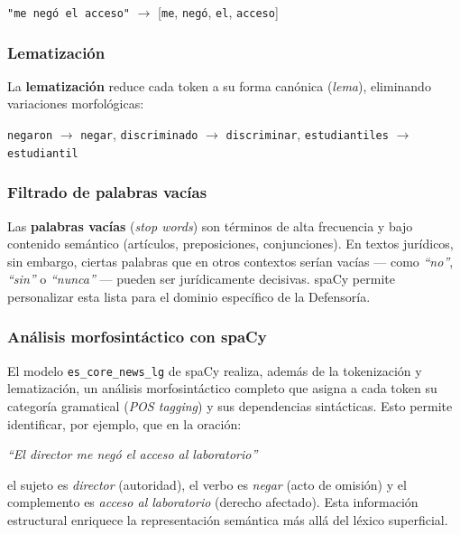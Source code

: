 \begin{center}
  \texttt{"me negó el acceso"} $\longrightarrow$
  [\texttt{me}, \texttt{negó}, \texttt{el}, \texttt{acceso}]
\end{center}

\subsubsection*{Lematización}

La \textbf{lematización} reduce cada token a su forma canónica (\textit{lema}),
eliminando variaciones morfológicas:

\begin{center}
  \texttt{negaron} $\to$ \texttt{negar}, \quad
  \texttt{discriminado} $\to$ \texttt{discriminar}, \quad
  \texttt{estudiantiles} $\to$ \texttt{estudiantil}
\end{center}

\subsubsection*{Filtrado de palabras vacías}

Las \textbf{palabras vacías} (\textit{stop words}) son términos de alta
frecuencia y bajo contenido semántico (artículos, preposiciones, conjunciones).
En textos jurídicos, sin embargo, ciertas palabras que en otros contextos serían
vacías — como \textit{``no''}, \textit{``sin''} o \textit{``nunca''} — pueden
ser jurídicamente decisivas. spaCy permite personalizar esta lista para el
dominio específico de la Defensoría.

\subsubsection*{Análisis morfosintáctico con spaCy}

El modelo \texttt{es\_core\_news\_lg} de spaCy realiza, además de la
tokenización y lematización, un análisis morfosintáctico completo que asigna a
cada token su categoría gramatical (\textit{POS tagging}) y sus dependencias
sintácticas. Esto permite identificar, por ejemplo, que en la oración:

\begin{center}
  \textit{``El director me negó el acceso al laboratorio''}
\end{center}

\noindent el sujeto es \textit{director} (autoridad), el verbo es \textit{negar}
(acto de omisión) y el complemento es \textit{acceso al laboratorio} (derecho
afectado). Esta información estructural enriquece la representación semántica
más allá del léxico superficial.

